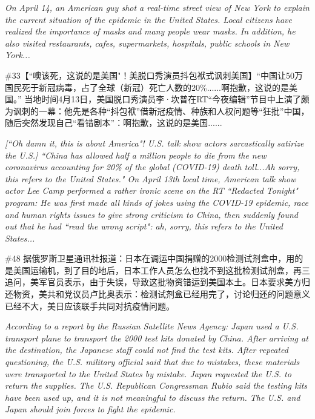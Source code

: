 \documentclass [11pt, proquest] {uwthesis}[2020/02/24]
\begin{document}
\textit{On April 14, an American guy shot a real-time street view of New York to explain the current situation of the epidemic in the United States. Local citizens have realized the importance of masks and many people wear masks. In addition, he also visited restaurants, cafes, supermarkets, hospitals, public schools in New York...}

\begin{CJK*}{UTF8}{gbsn}\#33【“噢该死，这说的是美国"！美脱口秀演员抖包袱式讽刺美国】“中国让50万国民死于新冠病毒，占了全球（新冠）死亡人数的20\%......啊抱歉，这说的是美国。” 当地时间4月13日，美国脱口秀演员李·坎普在RT“今夜编辑”节目中上演了颇为讽刺的一幕：他先是各种“抖包袱”借新冠疫情、种族和人权问题等“狂批”中国，随后突然发现自己“看错剧本”：啊抱歉，这说的是美国......\end{CJK*}

\textit{[“Oh damn it, this is about America"! U.S. talk show actors sarcastically satirize the U.S.] “China has allowed half a million people to die from the new coronavirus accounting for 20\% of the global (COVID-19) death toll...Ah sorry, this refers to the United States." On April 13th local time, American talk show actor Lee Camp performed a rather ironic scene on the RT “Redacted Tonight" program: He was first made all kinds of jokes using the COVID-19 epidemic, race and human rights issues to give strong criticism to China, then suddenly found out that he had “read the wrong script": ah, sorry, this refers to the United States...}
\newpage

\begin{CJK*}{UTF8}{gbsn}\#48 据俄罗斯卫星通讯社报道：日本在调运中国捐赠的2000检测试剂盒中，用的是美国运输机，到了目的地后，日本工作人员怎么也找不到这批检测试剂盒，再三追问，美军官员表示，由于失误，导致这批物资错运到美国本土。日本要求美方归还物资，美共和党议员卢比奥表示：检测试剂盒已经用完了，讨论归还的问题意义已经不大，美日应该联手共同对抗疫情问题。\end{CJK*}

\textit{According to a report by the Russian Satellite News Agency: Japan used a U.S. transport plane to transport the 2000 test kits donated by China. After arriving at the destination, the Japanese staff could not find the test kits. After repeated questioning, the U.S. military official said that due to mistakes, these materials were transported to the United States by mistake. Japan requested the U.S. to return the supplies. The U.S. Republican Congressman Rubio said the testing kits have been used up, and it is not meaningful to discuss the return. The U.S. and Japan should join forces to fight the epidemic.}
\end{document}
